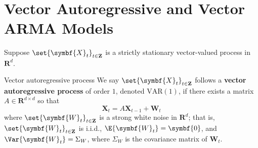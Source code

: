 \section{Vector Autoregressive and Vector ARMA Models}
Suppose $ \set{\symbf{X}_t}_{t\in\mathbf{Z}} $ is a strictly stationary
vector-valued process in $ \mathbf{R}^d $.
\begin{Definition}{Vector autoregressive process}{}
    We say $ \set{\symbf{X}_t}_{t\in\mathbf{Z}} $ follows a
    \textbf{vector autoregressive process} of order $ 1 $, denoted
    $ \text{VAR}(1) $, if there exists a matrix $ A\in\mathbf{R}^{d\times d} $
    so that
    \[ \symbf{X}_t=A \symbf{X}_{t-1}+\symbf{W}_t \]
    where $ \set{\symbf{W}_t}_{t\in\mathbf{Z}} $ is a strong white noise in $ \mathbf{R}^d $;
    that is, $ \set{\symbf{W}_t}_{t\in\mathbf{Z}} $ is i.i.d., $ \E{\symbf{W}_t}=\symbf{0} $,
    and $ \Var{\symbf{W}_t}=\Sigma_W $, where $ \Sigma_W $ is the covariance
    matrix of $ \symbf{W}_t $.
\end{Definition}
